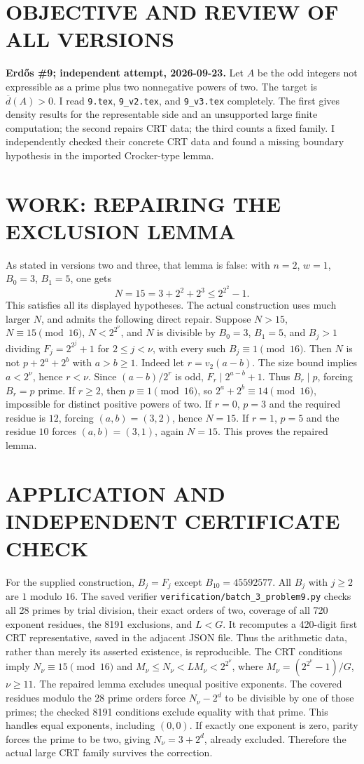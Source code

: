 \section{OBJECTIVE AND REVIEW OF ALL VERSIONS}
\textbf{Erd\H{o}s \#9; independent attempt, 2026-09-23.}
Let $A$ be the odd integers not expressible as a prime plus two nonnegative powers of two. The target is $\overline d(A)>0$. I read \texttt{9.tex}, \texttt{9\_v2.tex}, and \texttt{9\_v3.tex} completely. The first gives density results for the representable side and an unsupported large finite computation; the second repairs CRT data; the third counts a fixed family. I independently checked their concrete CRT data and found a missing boundary hypothesis in the imported Crocker-type lemma.
\section{WORK: REPAIRING THE EXCLUSION LEMMA}
As stated in versions two and three, that lemma is false: with $n=2$, $w=1$, $B_0=3$, $B_1=5$, one gets
\[
N=15=3+2^2+2^3\le2^{2^2}-1.
\]
This satisfies all its displayed hypotheses. The actual construction uses much larger $N$, and admits the following direct repair.
Suppose $N>15$, $N\equiv15\pmod{16}$, $N<2^{2^\nu}$, and $N$ is divisible by $B_0=3$, $B_1=5$, and $B_j>1$ dividing $F_j=2^{2^j}+1$ for $2\le j<\nu$, with every such $B_j\equiv1\pmod{16}$. Then $N$ is not $p+2^a+2^b$ with $a>b\ge1$.
Indeed let $r=v_2(a-b)$. The size bound implies $a<2^\nu$, hence $r<\nu$. Since $(a-b)/2^r$ is odd, $F_r\mid2^{a-b}+1$. Thus $B_r\mid p$, forcing $B_r=p$ prime. If $r\ge2$, then $p\equiv1\pmod{16}$, so $2^a+2^b\equiv14\pmod{16}$, impossible for distinct positive powers of two. If $r=0$, $p=3$ and the required residue is $12$, forcing $(a,b)=(3,2)$, hence $N=15$. If $r=1$, $p=5$ and the residue $10$ forces $(a,b)=(3,1)$, again $N=15$. This proves the repaired lemma.
\section{APPLICATION AND INDEPENDENT CERTIFICATE CHECK}
For the supplied construction, $B_j=F_j$ except $B_{10}=45592577$. All $B_j$ with $j\ge2$ are $1$ modulo $16$. The saved verifier \texttt{verification/batch\_3\_problem9.py} checks all 28 primes by trial division, their exact orders of two, coverage of all 720 exponent residues, the 8191 exclusions, and $L<G$. It recomputes a 420-digit first CRT representative, saved in the adjacent JSON file. Thus the arithmetic data, rather than merely its asserted existence, is reproducible.
The CRT conditions imply $N_\nu\equiv15\pmod{16}$ and $M_\nu\le N_\nu<LM_\nu<2^{2^\nu}$, where $M_\nu=(2^{2^\nu}-1)/G$, $\nu\ge11$. The repaired lemma excludes unequal positive exponents. The covered residues modulo the 28 prime orders force $N_\nu-2^d$ to be divisible by one of those primes; the checked 8191 conditions exclude equality with that prime. This handles equal exponents, including $(0,0)$. If exactly one exponent is zero, parity forces the prime to be two, giving $N_\nu=3+2^d$, already excluded. Therefore the actual large CRT family survives the correction.
